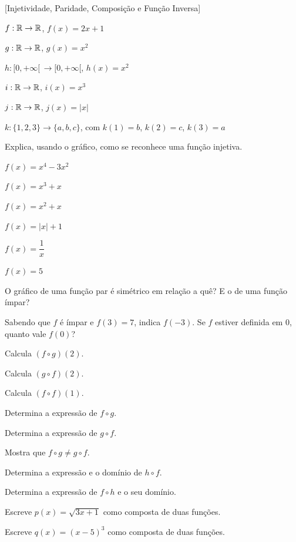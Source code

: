 \documentclass[12pt]{article}
\begin{document}
[Injetividade, Paridade, Composição e Função Inversa]


\begin{exercicios}
  \item $f : \mathbb{R} \to \mathbb{R}$, $f(x) = 2x + 1$
  \item $g : \mathbb{R} \to \mathbb{R}$, $g(x) = x^2$
  \item $h : [0, +\infty[\, \to [0, +\infty[$, $h(x) = x^2$
  \item $i : \mathbb{R} \to \mathbb{R}$, $i(x) = x^3$
  \item $j : \mathbb{R} \to \mathbb{R}$, $j(x) = |x|$
  \item $k : \{1, 2, 3\} \to \{a, b, c\}$, com $k(1) = b$, $k(2) = c$, $k(3) = a$
  \item Explica, usando o gráfico, como se reconhece uma função injetiva.
\end{exercicios}

\begin{exercicios}
  \item $f(x) = x^4 - 3x^2$
  \item $f(x) = x^3 + x$
  \item $f(x) = x^2 + x$
  \item $f(x) = |x| + 1$
  \item $f(x) = \dfrac{1}{x}$
  \item $f(x) = 5$
  \item O gráfico de uma função par é simétrico em relação a quê? E o de uma função ímpar?
  \item Sabendo que $f$ é ímpar e $f(3) = 7$, indica $f(-3)$. Se $f$ estiver definida em $0$, quanto vale $f(0)$?
\end{exercicios}

\begin{exercicios}
  \item Calcula $(f \circ g)(2)$.
  \item Calcula $(g \circ f)(2)$.
  \item Calcula $(f \circ f)(1)$.
  \item Determina a expressão de $f \circ g$.
  \item Determina a expressão de $g \circ f$.
  \item Mostra que $f \circ g \neq g \circ f$.
  \item Determina a expressão e o domínio de $h \circ f$.
  \item Determina a expressão de $f \circ h$ e o seu domínio.
  \item Escreve $p(x) = \sqrt{3x + 1}$ como composta de duas funções.
  \item Escreve $q(x) = (x - 5)^3$ como composta de duas funções.
\end{exercicios}
\end{document}
